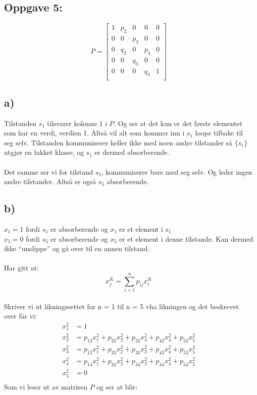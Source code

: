 \documentclass[a4paper, norsk, twoside, 10pt]{article}
\begin{document}
\begin{flushleft}
  \section*{Oppgave 5:}

  \def\matrixPgen{
    \begin{bmatrix}
      1 & p_{2} & 0 & 0 & 0 \\
      0 & 0   & p_{3} & 0 & 0 \\
      0 & q_{2} & 0 & p_{4} & 0 \\
      0 & 0   & q_{3} & 0 & 0 \\
      0 & 0 & 0 & q_{4} & 1 \\
   \end{bmatrix}
  }
   \[P = \matrixPgen \]
   \subsection*{a)}
   Tilstanden $s_{1}$ tilsvarer kolonne 1 i $P$. Og ser at det kun er det første elementet som har en verdi, verdien 1. Altså vil alt som kommer inn i $s_{1}$ loope tilbake til seg selv. Tilstanden kommuniserer heller ikke med noen andre tilstander så $\{s_{1}\}$ utgjør en lukket klasse, og $s_{1}$ er dermed absorberende.\\
   \ \\
   Det samme ser vi for tilstand $s_{5}$, kommuniserer bare med seg selv. Og leder ingen andre tilstander. Altså er også $s_{5}$ absorberende.


   \subsection*{b)}
   $x_{1} = 1$ fordi $s_{1}$ er absorberende og $x_{1}$ er et element i $s_{1}$ \\
   $x_{5} = 0$ fordi $s_{5}$ er absorberende og $x_{5}$ er et element i denne tilstande. Kan dermed ikke ``unslippe'' og gå over til en annen tilstand. \\
   \ \\
   Har gitt at:
   \[x_{j}^{K} = \sum_{i = 1}^{n} p_{ij}x_{i}^{K}\]\\

   Skriver vi ut  likningssettet for n = 1 til n = 5 vha likningen og det beskrevet over får vi:
   \begin{align*}
     x_{1}^{2} &= 1 \\
     x_{2}^{2} &= p_{12}x_{1}^{2} + p_{22}x_{2}^{2} + p_{32}x_{3}^{2} + p_{42}x_{4}^{2} + p_{52}x_{5}^{2} \\
     x_{3}^{2} &= p_{13}x_{1}^{2} + p_{23}x_{2}^{2} + p_{33}x_{3}^{2} + p_{43}x_{4}^{2} + p_{53}x_{5}^{2} \\
     x_{4}^{2} &= p_{14}x_{1}^{2} + p_{24}x_{2}^{2} + p_{34}x_{3}^{2} + p_{44}x_{4}^{2} + p_{54}x_{5}^{2}\\
     x_{5}^{2} &= 0 \\
   \end{align*}
   Som vi leser ut av matrisen $P$ og ser at blir:


\end{flushleft}
\end{document}
